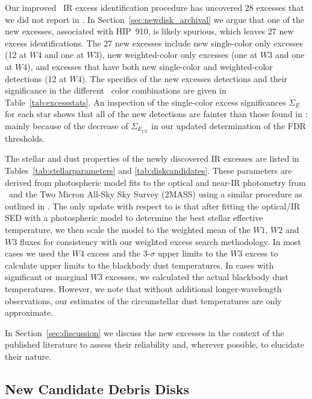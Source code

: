     Our improved \WS\ IR excess identification procedure has uncovered %
    28 excesses that we did not report in .  In Section~\ref{sec:newdisk_archival} we argue that one of the new excesses, associated with HIP~910, is likely spurious, which leaves %
    27 new excess identifications. The 27 new excesses include new single-color only excesses (12 %
at $W4$ and one at $W3$), new weighted-color only excesses (one at $W3$ and one at $W4$), and excesses that have both new single-color and weighted-color detections (12 %
at $W4$).  The specifics of the new excesses detections and their significance in the different \WS\ color combinations are given in Table~\ref{tab:excessstats}.  An inspection of the single-color excess significances $\Sigma_E$ for each star shows that all of the new detections are fainter than those found in : mainly because of the decrease of $\Sigma_{E_{CL}}$ in our updated determination of the FDR thresholds. 

    The stellar and dust properties of the newly discovered IR excesses are listed in Tables~\ref{tab:stellarparameters} and \ref{tab:diskcandidates}. These parameters are derived from photospheric model fits to the optical and near-IR photometry from \hip\ and the Two Micron All-Sky Sky Survey (2MASS) using a similar procedure as outlined in . The only update with respect to  is that after fitting the optical/IR SED with a photospheric model to determine the best stellar effective temperature, we then scale the model to the weighted mean of the $W1$, $W2$ and $W3$ fluxes for consistency with our weighted excess search methodology.  In most cases we used the $W4$ excess and the 3-$\sigma$ upper limits to the $W3$ excess to calculate upper limits to the blackbody dust temperatures.  In cases with significant or marginal $W3$ excesses, we calculated the actual blackbody dust temperatures.  However, we note that without additional longer-wavelength observations, our estimates of the circumstellar dust temperatures are only approximate.
    
    In Section~\ref{sec:discussion} we discuss the new excesses in the context of the published literature to assess their reliability and, wherever possible, to elucidate their nature. 

    \subsection{New Candidate Debris Disks}
    \label{sec:new_disks}

